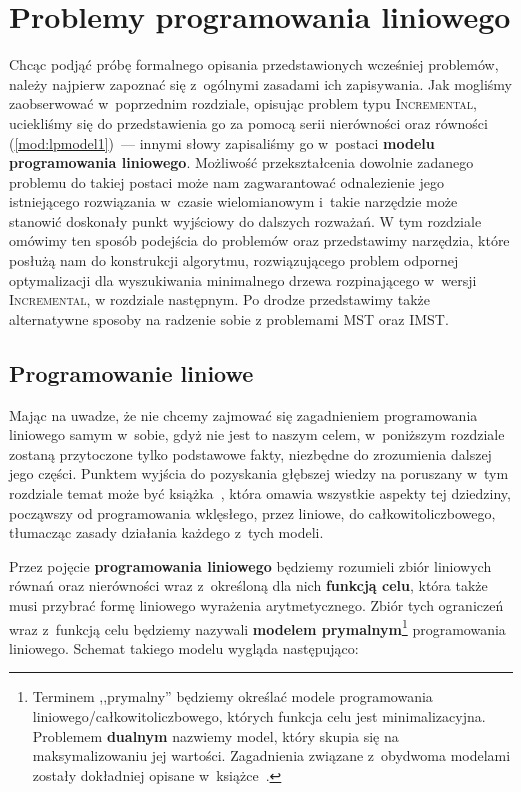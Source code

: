 \chapter{Problemy programowania liniowego}\label{ch:linearprog}
\thispagestyle{chapterBeginStyle}





Chcąc podjąć próbę formalnego opisania przedstawionych wcześniej problemów, należy najpierw zapoznać się z~ogólnymi zasadami ich zapisywania.
Jak mogliśmy zaobserwować w~poprzednim rozdziale, opisując problem typu \textsc{Incremental}, uciekliśmy się do przedstawienia go za pomocą serii nierówności oraz równości (\ref{mod:lpmodel1})~--- innymi słowy zapisaliśmy go w~postaci \textbf{modelu programowania liniowego}.
Możliwość przekształcenia dowolnie zadanego problemu do takiej postaci może nam zagwarantować odnalezienie jego istniejącego rozwiązania w~czasie wielomianowym i~takie narzędzie może stanowić doskonały punkt wyjściowy do dalszych rozważań.
W tym rozdziale omówimy ten sposób podejścia do problemów oraz przedstawimy narzędzia, które posłużą nam do konstrukcji algorytmu, rozwiązującego problem odpornej optymalizacji dla wyszukiwania minimalnego drzewa rozpinającego w~wersji \textsc{Incremental}, w rozdziale następnym.
Po drodze przedstawimy także alternatywne sposoby na radzenie sobie z problemami \textsc{MST} oraz \textsc{IMST}.




\section{Programowanie liniowe}




Mając na uwadze, że nie chcemy zajmować się zagadnieniem programowania liniowego samym w~sobie, gdyż nie jest to naszym celem, w~poniższym rozdziale zostaną przytoczone tylko podstawowe fakty, niezbędne do zrozumienia dalszej jego części.
Punktem wyjścia do pozyskania głębszej wiedzy na poruszany w~tym rozdziale temat może być książka~\cite{Papadimitriou:1982:COA:31027}, która omawia wszystkie aspekty tej dziedziny, począwszy od programowania wklęsłego, przez liniowe, do całkowitoliczbowego, tłumacząc zasady działania każdego z~tych modeli.

Przez pojęcie \textbf{programowania liniowego} będziemy rozumieli zbiór liniowych równań oraz nierówności wraz z~określoną dla nich \textbf{funkcją celu}, która także musi przybrać formę liniowego wyrażenia arytmetycznego.
Zbiór tych ograniczeń wraz z~funkcją celu będziemy nazywali \textbf{modelem prymalnym}\footnote{
	Terminem ,,prymalny'' będziemy określać modele programowania liniowego/całkowitoliczbowego, których funkcja celu jest minimalizacyjna.
	Problemem \textbf{dualnym} nazwiemy model, który skupia się na maksymalizowaniu jej wartości.
	Zagadnienia związane z~obydwoma modelami zostały dokładniej opisane w~książce~\cite[$67$--$73$]{Papadimitriou:1982:COA:31027}.
} programowania liniowego.
Schemat takiego modelu wygląda następująco:

